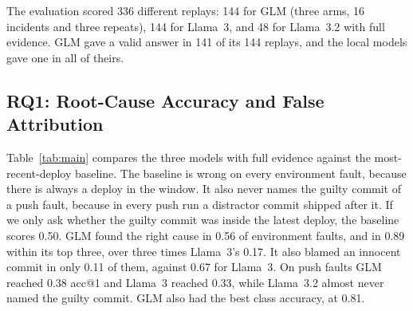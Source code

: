 \documentclass[12pt,onecolumn,draftclsnofoot]{IEEEtran}
\begin{document}
The evaluation scored 336 different replays: 144 for GLM (three arms, 16 incidents and three repeats), 144 for Llama~3, and 48 for Llama~3.2 with full evidence. GLM gave a valid answer in 141 of its 144 replays, and the local models gave one in all of theirs.

\subsection{RQ1: Root-Cause Accuracy and False Attribution}
Table~\ref{tab:main} compares the three models with full evidence against the most-recent-deploy baseline. The baseline is wrong on every environment fault, because there is always a deploy in the window. It also never names the guilty commit of a push fault, because in every push run a distractor commit shipped after it. If we only ask whether the guilty commit was inside the latest deploy, the baseline scores 0.50. GLM found the right cause in 0.56 of environment faults, and in 0.89 within its top three, over three times Llama~3's 0.17. It also blamed an innocent commit in only 0.11 of them, against 0.67 for Llama~3. On push faults GLM reached 0.38 acc@1 and Llama~3 reached 0.33, while Llama~3.2 almost never named the guilty commit. GLM also had the best class accuracy, at 0.81.

\begin{table}[!t]
\caption{Full-Evidence Results Against the Baseline (mean $\pm$ std over 3 repeats; best in bold)}
\label{tab:main}
\centering
\setlength{\tabcolsep}{4pt}
\end{table}
\end{document}
